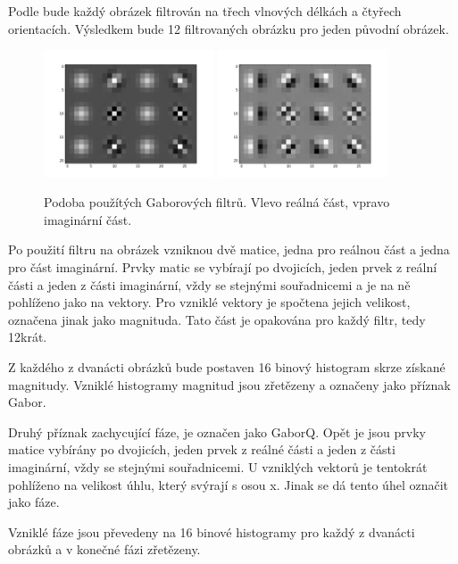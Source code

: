 \documentclass[czech,BP]{thesiskiv}
\begin{document}
\par Podle \citep{JEC} bude každý obrázek filtrován na třech vlnových délkách a čtyřech orientacích. Výsledkem bude 12 filtrovaných obrázku pro jeden původní obrázek. 


\begin{figure}[H]
	\centering
	\includegraphics[width=190px]{./img/gabor_filtry.png}
	\includegraphics[width=190px]{./img/gabor_filter_imag.png}	
	\caption{Podoba použítých Gaborových filtrů. Vlevo reálná část, vpravo imaginární část.}
\end{figure}

\par Po použití filtru na obrázek vzniknou dvě matice, jedna pro reálnou část a jedna pro část imaginární. Prvky matic se vybírají po dvojicích, jeden prvek z reální části a jeden z části imaginární, vždy se stejnými souřadnicemi a je na ně pohlíženo jako na vektory. Pro vzniklé vektory je spočtena jejich velikost, označena jinak jako magnituda. Tato část je opakována pro každý filtr, tedy 12krát.

\par Z každého z dvanácti obrázků bude postaven 16 binový histogram skrze získané magnitudy. Vzniklé histogramy magnitud jsou zřetězeny a označeny jako příznak Gabor. 

\par Druhý příznak zachycující fáze, je označen jako GaborQ. Opět je jsou prvky matice vybírány po dvojicích, jeden prvek z reálné části a jeden z části imaginární, vždy se stejnými souřadnicemi. U vzniklých vektorů je tentokrát pohlíženo na velikost úhlu, který svýrají s osou x. Jinak se dá tento úhel označit jako fáze.   
\par Vzniklé fáze jsou převedeny na 16 binové histogramy pro každý z dvanácti obrázků a v konečné fázi zřetězeny.
\end{document}
